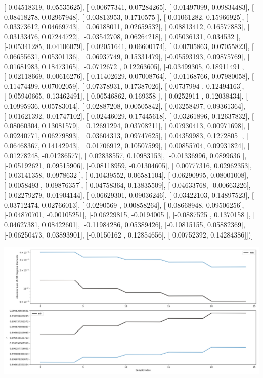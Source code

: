 \documentclass{article}
\begin{document}
       [ 0.04518319,  0.05535625],
       [ 0.00677341,  0.07284265],
       [-0.01497099,  0.09834483],
       [ 0.08418278,  0.02967948],
       [ 0.03813953,  0.1710575 ],
       [ 0.01061282,  0.15966925],
       [ 0.03373612,  0.04669743],
       [ 0.06188011,  0.02659532],
       [ 0.08813412,  0.16577883],
       [ 0.03133476,  0.07244722],
       [-0.03542708,  0.06264218],
       [ 0.05036131,  0.034532  ],
       [-0.05341285,  0.04106079],
       [ 0.02051641,  0.06600174],
       [ 0.00705863,  0.07055823],
       [ 0.06655631,  0.05301136],
       [ 0.06937749,  0.15331479],
       [-0.05593193,  0.09875769],
       [ 0.01681983,  0.18473165],
       [-0.0712672 ,  0.12263605],
       [-0.03499305,  0.18911491],
       [-0.02118669,  0.00616276],
       [ 0.11402629,  0.07008764],
       [ 0.01168766,  0.07980058],
       [ 0.11474499,  0.07002059],
       [-0.07378931,  0.17387026],
       [ 0.0737994 ,  0.12494163],
       [-0.05940665,  0.13462491],
       [ 0.06546862,  0.169358  ],
       [ 0.0252911 ,  0.12038434],
       [ 0.10995936,  0.05783014],
       [ 0.02887208,  0.00505842],
       [-0.03258497,  0.09361364],
       [-0.01621392,  0.01747102],
       [ 0.02446029,  0.17445618],
       [-0.03261896,  0.12637832],
       [ 0.08060304,  0.13081579],
       [ 0.12691294,  0.03708211],
       [ 0.07930413,  0.00971698],
       [ 0.09240771,  0.06279893],
       [ 0.03604313,  0.09747625],
       [ 0.04359983,  0.1272805 ],
       [ 0.06468367,  0.14142943],
       [ 0.01706912,  0.10507599],
       [ 0.00855704,  0.09931824],
       [ 0.01278248, -0.01286577],
       [ 0.02838557,  0.10983153],
       [-0.01336996,  0.0899636 ],
       [-0.05192621,  0.09515906],
       [-0.08118959, -0.01304605],
       [ 0.00777316,  0.02962353],
       [-0.03141358,  0.0978632 ],
       [ 0.10439552,  0.06581104],
       [ 0.06290995,  0.08001008],
       [-0.0058493 ,  0.09876357],
       [-0.04758364,  0.13835509],
       [-0.04633768, -0.00663226],
       [-0.02279279,  0.01904144],
       [-0.06629301,  0.09036246],
       [-0.03422103,  0.14897523],
       [ 0.03712474,  0.02766013],
       [ 0.0290569 ,  0.00858264],
       [-0.08668948,  0.09506256],
       [-0.04870701, -0.00105251],
       [-0.06229815, -0.0194005 ],
       [-0.0887525 ,  0.1370158 ],
       [ 0.04627381,  0.08422601],
       [-0.11984286,  0.05389426],
       [-0.10815155,  0.05882369],
       [-0.06250473,  0.03893901],
       [-0.0150162 ,  0.12854656],
       [ 0.00752392,  0.14284386]])]
\begin{center}
\includegraphics[scale=.9]{report_pickled_controls212/control_dpn_all.png}

\end{center}
\end{document}
